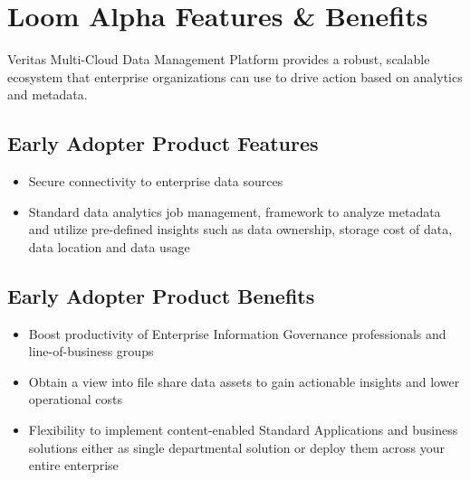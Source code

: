 \documentclass[letterpaper,10pt,english]{sphinxhowto}
\begin{document}
\section{Loom Alpha Features \& Benefits}
\label{\detokenize{col/ds/mcdmp_ds_alpha1:loom-alpha-features-benefits}}
Veritas Multi-Cloud Data Management Platform provides a robust, scalable ecosystem that enterprise organizations can use to drive action based on analytics and metadata.


\subsection{Early Adopter Product Features}
\label{\detokenize{col/ds/mcdmp_ds_alpha1:early-adopter-product-features}}\begin{itemize}
\item {} 
Secure connectivity to enterprise data sources

\item {} 
Standard data analytics job management, framework to analyze metadata and utilize pre-defined insights such as data ownership, storage cost of data, data location and data usage

\end{itemize}


\subsection{Early Adopter Product Benefits}
\label{\detokenize{col/ds/mcdmp_ds_alpha1:early-adopter-product-benefits}}\begin{itemize}
\item {} 
Boost productivity of Enterprise Information Governance professionals and line-of-business groups

\item {} 
Obtain a view into file share data assets to gain actionable insights and lower operational costs

\item {} 
Flexibility to implement content-enabled Standard Applications and business solutions either as single departmental
solution or deploy them across your entire enterprise

\end{itemize}
\end{document}
